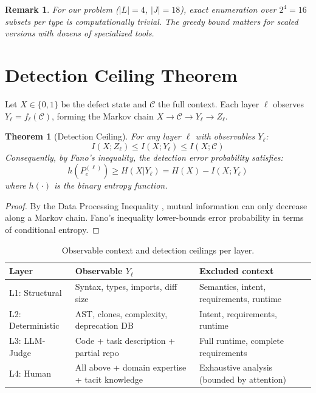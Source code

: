 \documentclass[11pt, a4paper, logo, copyright]{googledeepmind}
\newtheorem{theorem}{Theorem}[section]
\newtheorem*{remark}{Remark}
\begin{document}
\begin{remark}
For our problem ($|L| = 4$, $|J| = 18$), exact enumeration over $2^4 = 16$ subsets per type is computationally trivial. The greedy bound matters for scaled versions with dozens of specialized tools.
\end{remark}


\section{Detection Ceiling Theorem}
\label{sec:ceilings}

Let $X \in \{0,1\}$ be the defect state and $\mathcal{C}$ the full context. Each layer $\ell$ observes $Y_\ell = f_\ell(\mathcal{C})$, forming the Markov chain $X \to \mathcal{C} \to Y_\ell \to Z_\ell$.

\begin{theorem}[Detection Ceiling]
\label{thm:ceiling}
For any layer $\ell$ with observables $Y_\ell$:
\begin{equation}
I(X; Z_\ell) \leq I(X; Y_\ell) \leq I(X; \mathcal{C})
\end{equation}
Consequently, by Fano's inequality, the detection error probability satisfies:
\begin{equation}
h(P_e^{(\ell)}) \geq H(X | Y_\ell) = H(X) - I(X; Y_\ell)
\end{equation}
where $h(\cdot)$ is the binary entropy function.
\end{theorem}

\begin{proof}
By the Data Processing Inequality \citep{coverthomas2006}, mutual information can only decrease along a Markov chain. Fano's inequality lower-bounds error probability in terms of conditional entropy.
\end{proof}

\begin{table}[htbp]
\centering
\caption{Observable context and detection ceilings per layer.}
\label{tab:ceilings}
\small
\begin{tabularx}{\textwidth}{l X X}
\toprule
\textbf{Layer} & \textbf{Observable $Y_\ell$} & \textbf{Excluded context} \\
\midrule
L1: Structural & Syntax, types, imports, diff size & Semantics, intent, requirements, runtime \\
L2: Deterministic & AST, clones, complexity, deprecation DB & Intent, requirements, runtime \\
L3: LLM-Judge & Code + task description + partial repo & Full runtime, complete requirements \\
L4: Human & All above + domain expertise + tacit knowledge & Exhaustive analysis (bounded by attention) \\
\bottomrule
\end{tabularx}
\end{table}
\end{document}
